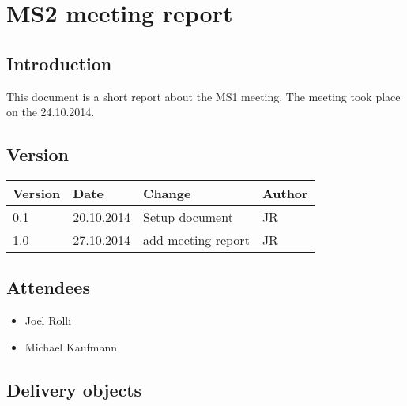 
\chapter{MS2 meeting report} %

\label{MS2 meeting report} %



\section{Introduction}

This document is a short report about the MS1 meeting. The meeting took place on the 24.10.2014.

\section{Version}


\begin{tabular}{| p{1.5cm} | p{2cm} | p{9cm} | p{1.5cm} |}
    \hline
    Version 	& Date      		& Change & Author 								\\ \hline
    0.1    		& 20.10.2014        & Setup document        				& JR 	\\ \hline
    1.0 		& 27.10.2014 		& add meeting report 					& JR 	\\ \hline
\end{tabular}


\section{Attendees}
\begin{itemize}
\item Joel Rolli
\item Michael Kaufmann
\end{itemize}

\section{Delivery objects}


